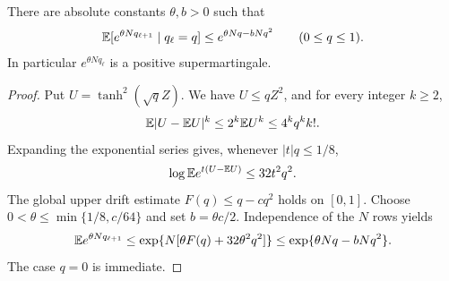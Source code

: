 \begin{lemma}
\label{lem:variance-supermartingale}
There are absolute constants $\theta,b>0$ such that
\begin{equation}
 \mathbb E[e^{\theta N q_{\ell+1}}\mid q_\ell=q]
 \le e^{\theta Nq-bNq^2}\qquad(0\le q\le1).
 \label{eq:variance-supermartingale}
\end{equation}
In particular $e^{\theta Nq_\ell}$ is a positive supermartingale.
\end{lemma}
\begin{proof}
Put $U=\tanh^2(\sqrt qZ)$. We have $U\le qZ^2$, and for every integer $k\ge2$,
\[
 \mathbb E|U-\mathbb E U|^k\le2^k\mathbb E U^k
 \le4^kq^k k!.
\]
Expanding the exponential series gives, whenever $|t|q\le1/8$,
\[
 \log\mathbb E e^{t(U-\mathbb E U)}\le32t^2q^2.
\]
The global upper drift estimate $F(q)\le q-cq^2$ holds on $[0,1]$. Choose
$0<\theta\le\min\{1/8,c/64\}$ and set $b=\theta c/2$. Independence of the $N$ rows yields
\[
 \mathbb E e^{\theta Nq_{\ell+1}}
 \le\exp\{N[\theta F(q)+32\theta^2q^2]\}
 \le\exp\{\theta Nq-bNq^2\}.
\]
The case $q=0$ is immediate.
\end{proof}

